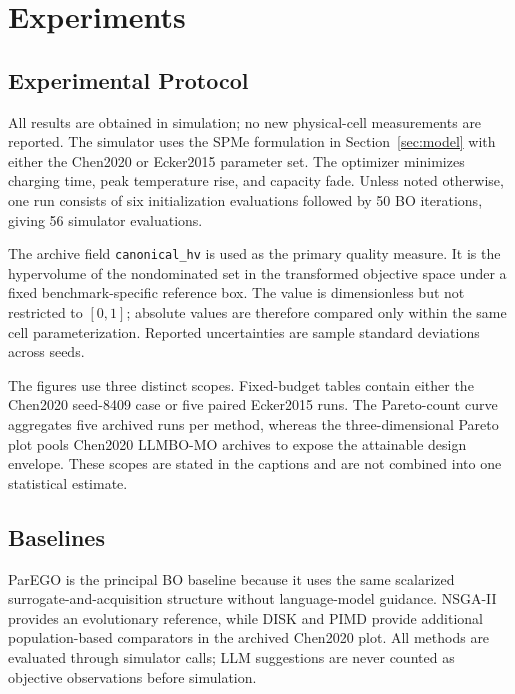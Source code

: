 \section{Experiments}
\label{sec:experiments}

\subsection{Experimental Protocol}

All results are obtained in simulation; no new physical-cell measurements are
reported. The simulator uses the SPMe formulation in
Section~\ref{sec:model} with either the Chen2020 or Ecker2015 parameter set.
The optimizer minimizes charging time, peak temperature rise, and capacity
fade. Unless noted otherwise, one run consists of six initialization
evaluations followed by 50 BO iterations, giving 56 simulator evaluations.

The archive field \texttt{canonical\_hv} is used as the primary quality
measure. It is the hypervolume of the nondominated set in the transformed
objective space under a fixed benchmark-specific reference box. The value is
dimensionless but not restricted to $[0,1]$; absolute values are therefore
compared only within the same cell parameterization. Reported uncertainties
are sample standard deviations across seeds.

The figures use three distinct scopes. Fixed-budget tables contain either the
Chen2020 seed-8409 case or five paired Ecker2015 runs. The Pareto-count curve
aggregates five archived runs per method, whereas the three-dimensional Pareto
plot pools Chen2020 LLMBO-MO archives to expose the attainable design envelope.
These scopes are stated in the captions and are not combined into one
statistical estimate.

\subsection{Baselines}

ParEGO is the principal BO baseline because it uses the same scalarized
surrogate-and-acquisition structure without language-model guidance. NSGA-II
provides an evolutionary reference, while DISK and PIMD provide additional
population-based comparators in the archived Chen2020 plot. All methods are
evaluated through simulator calls; LLM suggestions are never counted as
objective observations before simulation.

